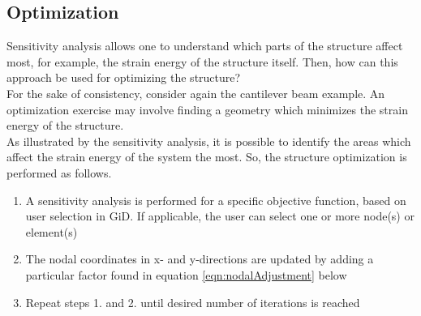 \subsection{Optimization} \label{section:optimization}
Sensitivity analysis allows one to understand which parts of the structure affect most, for example, the strain energy of the structure itself. Then, how can this approach be used for optimizing the structure? \\[6pt]
For the sake of consistency, consider again the cantilever beam example. An optimization exercise may involve finding a geometry which minimizes the strain energy of the structure.\\[6pt]
As illustrated by the sensitivity analysis, it is possible to identify the areas which affect the strain energy of the system the most. So, the structure optimization is performed as follows.
\begin{enumerate}
    \item A sensitivity analysis is performed for a specific objective function, based on user selection in GiD. If applicable, the user can select one or more node(s) or element(s)
    \item The nodal coordinates in x- and y-directions are updated by adding a particular factor found in equation \ref{eqn:nodalAdjustment} below
    \item Repeat steps 1. and 2. until desired number of iterations is reached
\end{enumerate}

